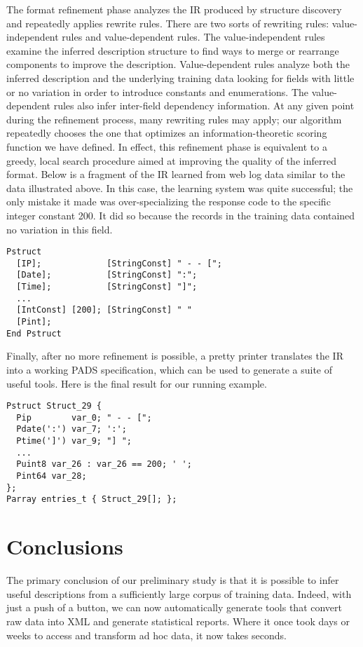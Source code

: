 \documentclass{article}
\begin{document}
The format refinement phase analyzes the IR produced by structure discovery
and repeatedly applies 
rewrite rules.  There are two sorts of rewriting rules: 
value-independent rules and value-dependent rules.
The value-independent rules examine the inferred description structure
to find ways to merge or rearrange components to improve the description.
Value-dependent rules analyze both the inferred description and the underlying
training data looking for fields with little or no 
variation in order to introduce constants and enumerations.
The value-dependent rules also infer
inter-field dependency information.
At any given point during the refinement process,
many rewriting rules may apply; our algorithm repeatedly chooses the one 
that optimizes an information-theoretic
scoring function we have defined.
In effect, this refinement phase is equivalent to a greedy, local search
procedure aimed at improving the quality of the inferred format.
Below is a fragment of the IR learned from web log data similar to the data
illustrated above.  In this case, the learning system was quite successful;  the only mistake it
made was over-specializing the response code 
to the specific integer constant 200.  It did so because the 
records in the training data contained no variation in this field.

{\small
\begin{verbatim}
Pstruct
  [IP];             [StringConst] " - - [";
  [Date];           [StringConst] ":";
  [Time];           [StringConst] "]";
  ...
  [IntConst] [200]; [StringConst] " " 
  [Pint];
End Pstruct
\end{verbatim}
}
Finally, after no more refinement is possible, a pretty printer 
translates the IR into a working PADS 
specification,  which can be used to generate
a suite of useful tools.  Here is the final result for
our running example.

{\small
\begin{verbatim}
Pstruct Struct_29 {
  Pip        var_0; " - - [";
  Pdate(':') var_7; ':';
  Ptime(']') var_9; "] ";
  ...
  Puint8 var_26 : var_26 == 200; ' ';
  Pint64 var_28;
};
Parray entries_t { Struct_29[]; };
\end{verbatim}
}

\section*{Conclusions}
The primary conclusion of our preliminary study 
is that it is possible to infer useful \pads{} descriptions 
from a sufficiently large corpus of training data.  Indeed,
with just a push of a button, we can now automatically generate
tools that convert raw data into XML and generate statistical reports.
Where it once took days or weeks to access and transform ad hoc data, it now
takes seconds.



\end{document}
